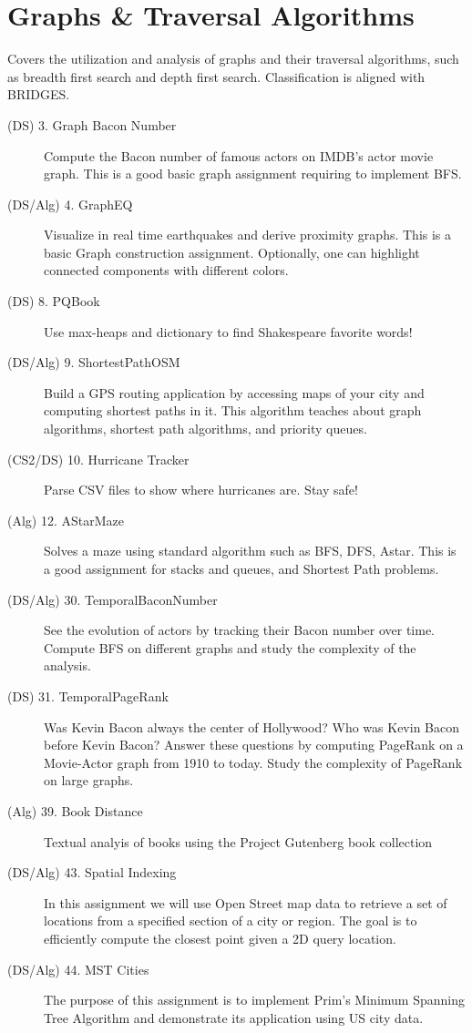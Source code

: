 \documentclass[10pt, onecoulmn]{article}
\begin{document}
\section{Graphs \& Traversal Algorithms}
Covers the utilization and analysis of graphs and their traversal algorithms, such as breadth first search and depth first search. Classification is aligned with BRIDGES.
\begin{description}
	\item[(DS) 3. Graph Bacon Number] Compute the Bacon number of famous actors on IMDB's actor movie graph. This is a good basic graph assignment requiring to implement BFS.
	\item[(DS/Alg) 4. GraphEQ] Visualize in real time earthquakes and derive proximity graphs. This is a basic Graph construction assignment. Optionally, one can highlight connected components with different colors.
	\item[(DS) 8. PQBook] Use max-heaps and dictionary to find Shakespeare favorite words!
	\item[(DS/Alg) 9. ShortestPathOSM] Build a GPS routing application by accessing maps of your city and computing shortest paths in it. This algorithm teaches about graph algorithms, shortest path algorithms, and priority queues.
	\item[(CS2/DS) 10. Hurricane Tracker] Parse CSV files to show where hurricanes are. Stay safe!
	\item[(Alg) 12. AStarMaze] Solves a maze using standard algorithm such as BFS, DFS, Astar. This is a good assignment for stacks and queues, and Shortest Path problems.
	\item[(DS/Alg) 30. TemporalBaconNumber] See the evolution of actors by tracking their Bacon number over time. Compute BFS on different graphs and study the complexity of the analysis.
	\item[(DS) 31. TemporalPageRank] Was Kevin Bacon always the center of Hollywood? Who was Kevin Bacon before Kevin Bacon? Answer these questions by computing PageRank on a Movie-Actor graph from 1910 to today. Study the complexity of PageRank on large graphs.
	\item[(Alg) 39. Book Distance] Textual analyis of books using the Project Gutenberg book collection
	\item[(DS/Alg) 43. Spatial Indexing] In this assignment we will use Open Street map data to retrieve a set of locations from a specified section of a city or region. The goal is to efficiently compute the closest point given a 2D query location.
	\item[(DS/Alg) 44. MST Cities] The purpose of this assignment is to implement Prim's Minimum Spanning Tree Algorithm and demonstrate its application using US city data.
\end{description}
\end{document}
